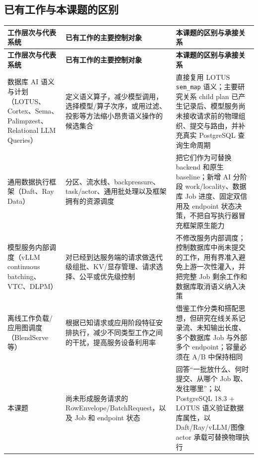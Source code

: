 \documentclass[10pt,a4paper]{ctexart}
\begin{document}
\subsection{已有工作与本课题的区别}
\begin{longtable}{>{\raggedright\arraybackslash}p{3.0cm}>{\raggedright\arraybackslash}p{5.7cm}>{\raggedright\arraybackslash}p{6.35cm}}
\toprule
\textbf{工作层次与代表系统} & \textbf{已有工作的主要控制对象} & \textbf{本课题的区别与承接关系} \\
\midrule
\endfirsthead
\toprule
\textbf{工作层次与代表系统} & \textbf{已有工作的主要控制对象} & \textbf{本课题的区别与承接关系} \\
\midrule
\endhead
数据库 AI 语义与计划（LOTUS、Cortex、Sema、Palimpzest、Relational LLM Queries） & 定义语义算子，减少模型调用，选择模型/算子次序，或用过滤、投影等方法缩小昂贵语义操作的候选集合 & 直接复用 LOTUS \texttt{sem\_map} 语义；主要研究关系 child plan 已产生记录后、模型服务尚未接收请求前的物理组织、提交与路由，并补充真实 PostgreSQL 查询生命周期 \\
\addlinespace
通用数据执行框架（Daft、Ray Data） & 分区、流水线、backpressure、task/actor、通用批处理以及框架拥有的资源调度 & 把它们作为可替换 backend 和原生 baseline；新增 AI 分阶段 work/locality、数据库 Job 进度、固定双信用及 endpoint 状态决策，不把自写执行器冒充框架原生能力 \\
\addlinespace
模型服务内部调度（vLLM continuous batching、VTC、DLPM） & 对已经到达服务端的请求做迭代级组批、KV/显存管理、请求选择、公平或优先级控制 & 不修改服务内部调度；控制数据库中尚未提交的工作，用有界准入避免上游一次性灌入，并把完整 Job 剩余工作和数据库取消语义纳入决策 \\
\addlinespace
离线工作负载/应用图调度（BlendServe 等） & 根据已知请求或应用阶段特征安排执行，减少不同类型工作之间的干扰，提高服务设备利用率 & 借鉴工作分类和搭配思想，但研究在线关系记录流、未知输出长度、多个数据库 Job 与外部多个 endpoint；容量必须在 A/B 中保持相同 \\
\addlinespace
本课题 & 尚未形成服务请求的 RowEnvelope/BatchRequest，以及 Job 和 endpoint 状态 & 回答“一批放什么、何时提交、从哪个 Job 取、发往哪里”；以 PostgreSQL 18.3 + LOTUS 语义验证数据库属性，以 Daft/Ray/vLLM/图像 actor 承载可替换物理执行 \\
\bottomrule
\end{longtable}
\end{document}
